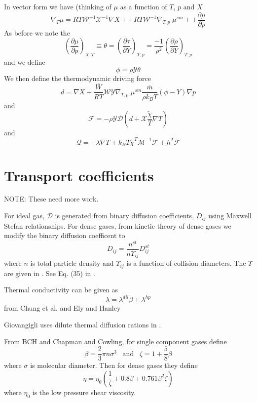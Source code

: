 \documentclass[11pt]{article}
\newcommand{\HeatFlux}{\boldsymbol{\mathcal{Q}}}
\newcommand{\SpeciesFlux}{\boldsymbol{\mathcal{F}}}
\newcommand{\mbar}{\overline{m}}
\begin{document}
In vector form we have (thinking of $\mu$ as a function of $T$, $p$ and $X$
\begin{equation}
\nabla_T \mu
= R T \mathcal{W}^{-1} \mathcal{X}^{-1} \nabla X +
+ R T \mathcal{W}^{-1} \nabla_{T,p} \; \mu^{sm} +
+ \frac{\partial \mu}{\partial p}
\end{equation}
As before we note the
\[
\left(\frac{\partial \mu}{\partial p}\right)_{X,T} \equiv \theta = \left(\frac{ \partial \tau}{\partial Y}\right)_{T,p}
 =
\frac{-1}{\rho^2}\left (\frac{\partial \rho}{\partial Y} \right)_{T,p}
\]
and we define
\[
\phi = \rho \mathcal{Y} \theta
\]
We then define the thermodynamic driving force
\[
d = \nabla X  + \frac{\overline{W}}{R T} \mathcal{W} \mathcal{Y} \nabla_{T,p} \; \mu^{sm}  \frac{\mbar}{\rho k_B T} (\phi - Y) \nabla p
\]
and
\[
\mathcal{F} = - \rho \mathcal{Y} \mathcal{D} ( d + \mathcal{X} \frac{ \tilde{\chi}}{T} \nabla T)
\]
and
\[
\HeatFlux = - \lambda \nabla T + k_B T {\tilde{\chi}}^T \mathcal{M}^{-1} \SpeciesFlux + h^T \SpeciesFlux
\]

\section{Transport coefficients}

NOTE:  These need more work.

For ideal gas, $\mathcal{D}$ is generated from binary diffusion coefficients, $D_{ij}$ using
Maxwell Stefan relationships.
For dense gases, from kinetic theory of dense gases we modify the binary diffusion coefficent to
\[
D_{ij} = \frac{n^{st}}{n \Upsilon_{ij}} D_{ij}^{st}
\]
where $n$ is total particle density and $\Upsilon_{ij}$ is a function of collision diameters.
The $\Upsilon$ are given in \cite{KurochkinETAL:1984}.
See Eq. (35) in \cite{giovangigli_CTM:2011}.

Thermal conductivity can be given as
\[
\lambda = \lambda^{dil} \beta + \lambda^{hp}
\]
from Chung et al. \cite{chung:1988} and Ely and Hanley \cite{ElyHanley:1983}

Giovangigli uses dilute thermal diffusion rations in 
\cite{giovangigli_CTM:2011}.

From BCH and Chapman and Cowling,
for single component gases define
\[
\beta = \frac {2}{3} \pi n \sigma^3 \;\;\; \mathrm{and} \;\;\; \zeta = 1+\frac{5}{8} \beta
\]
where $\sigma$ is molecular diameter.
Then for dense gases they define
\[
\eta = \eta_0 (\frac{1}{\zeta} + 0.8 \beta + 0.761 \beta^2 \zeta)
\]
where $\eta_0$ is the low pressure shear viscosity.
\end{document}
